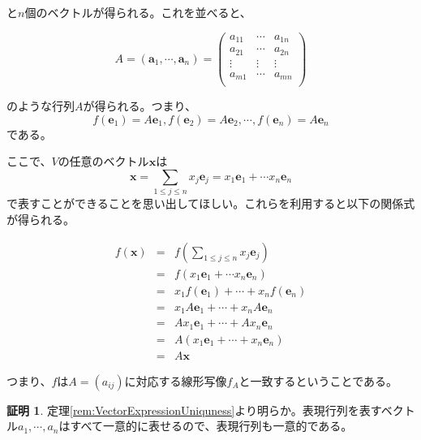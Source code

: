 \documentclass[dvipdfmx,autodetect-engine]{jsarticle}
\theoremstyle{definition}
\newtheorem*{Proof*}{証明}
\begin{document}
と$n$個のベクトルが得られる。これを並べると、

$$
A = (\bm{a}_1, \cdots, \bm{a}_n) = 
\begin{pmatrix}
a_{11} & \cdots & a_{1n} \\
a_{21} & \cdots & a_{2n} \\
\vdots & \vdots & \vdots \\
a_{m1} & \cdots & a_{mn} \\
\end{pmatrix}
$$

のような行列$A$が得られる。つまり、
$$
f(\bm{e}_1) = A\bm{e}_1, f(\bm{e}_2) = A\bm{e}_2, \cdots, f(\bm{e}_n) = A\bm{e}_n
$$
である。

ここで、$V$の任意のベクトル$\bm{x}$は
$$
\bm{x} = \sum_{1 \leq j \leq n} x_{j}\bm{e}_j = x_1\bm{e}_1 + \cdots x_n\bm{e}_n
$$で表すことができることを思い出してほしい。これらを利用すると以下の関係式が得られる。

\begin{eqnarray*}
f(\bm{x}) &= &f(\sum_{1 \leq j \leq n} x_{j}\bm{e}_j)  \\
&= &f(x_1\bm{e}_1 + \cdots x_n\bm{e}_n) \\
&= &x_1f(\bm{e}_1) + \cdots + x_nf(\bm{e}_n) \\
&= &x_1A\bm{e}_1 + \cdots + x_nA\bm{e}_n \\
&= &Ax_1\bm{e}_1 + \cdots + Ax_n\bm{e}_n \\
&= &A(x_1\bm{e}_1 + \cdots + x_n\bm{e}_n) \\
&= &A\bm{x}
\end{eqnarray*}

つまり、$f$は$A = (a_{ij})$に対応する線形写像$f_A$と一致するということである。



\begin{Proof*}
定理\ref{rem:VectorExpressionUniquness}より明らか。表現行列を表すベクトル$a_1, \cdots, a_n$はすべて一意的に表せるので、表現行列も一意的である。
\end{Proof*}
\end{document}
